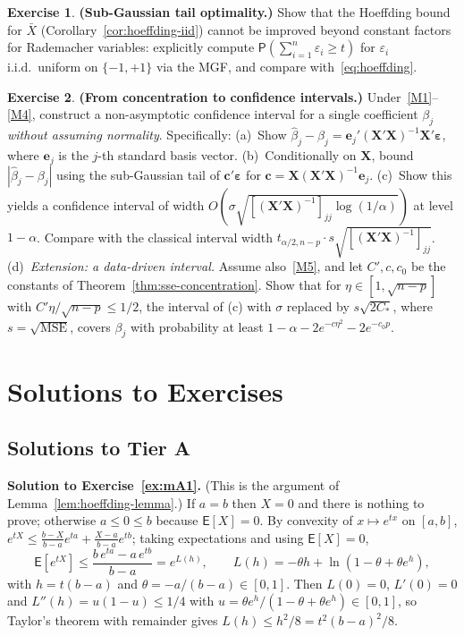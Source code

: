 \documentclass[12pt,a4paper]{article}
\theoremstyle{definition}
\newtheorem{exercise}{Exercise}[section]
\newcommand\expc{\mathsf{E}}
\newcommand\prb{\mathsf{P}}
\newcommand{\MSE}{\mathrm{MSE}}
\newcommand{\bX}{\mathbf{X}}
\newcommand{\be}{\boldsymbol{\varepsilon}}
\def\bc{\mathbf{c}}
\begin{document}
\begin{exercise}\label{ex:mC3}
\textbf{(Sub-Gaussian tail optimality.)} Show that the Hoeffding bound for $\bar{X}$ (Corollary~\ref{cor:hoeffding-iid}) cannot be improved beyond constant factors for Rademacher variables: explicitly compute $\prb(\sum_{i=1}^n \varepsilon_i \geqslant t)$ for $\varepsilon_i$ i.i.d.\ uniform on $\{-1, +1\}$ via the MGF, and compare with~\eqref{eq:hoeffding}.
\end{exercise}

\begin{exercise}\label{ex:mC4}
\textbf{(From concentration to confidence intervals.)} Under~\ref{M1}--\ref{M4}, construct a non-asymptotic confidence interval for a single coefficient $\beta_j$ \emph{without assuming normality}. Specifically: (a)~Show $\hat\beta_j - \beta_j = \mathbf{e}_j'(\bX'\bX)^{-1}\bX'\be$, where $\mathbf{e}_j$ is the $j$-th standard basis vector. (b)~Conditionally on $\bX$, bound $|\hat\beta_j - \beta_j|$ using the sub-Gaussian tail of $\bc'\be$ for $\bc = \bX(\bX'\bX)^{-1}\mathbf{e}_j$. (c)~Show this yields a confidence interval of width $O(\sigma\sqrt{[(\bX'\bX)^{-1}]_{jj}\log(1/\alpha)})$ at level $1-\alpha$. Compare with the classical interval width $t_{\alpha/2, n-p}\cdot s\sqrt{[(\bX'\bX)^{-1}]_{jj}}$. (d)~\emph{Extension: a data-driven interval.} Assume also~\ref{M5}, and let $C', c, c_0$ be the constants of Theorem~\ref{thm:sse-concentration}. Show that for $\eta \in [1, \sqrt{n-p}]$ with $C'\eta/\sqrt{n-p} \leqslant 1/2$, the interval of (c) with $\sigma$ replaced by $s\sqrt{2C_*}$, where $s = \sqrt{\MSE}$, covers $\beta_j$ with probability at least $1 - \alpha - 2e^{-c\eta^2} - 2e^{-c_0p}$.
\end{exercise}

\section{Solutions to Exercises}\label{sec:modern-solutions}

\subsection*{Solutions to Tier A}

\textbf{Solution to Exercise~\ref{ex:mA1}.} (This is the argument of Lemma~\ref{lem:hoeffding-lemma}.) If $a = b$ then $X = 0$ and there is nothing to prove; otherwise $a \leqslant 0 \leqslant b$ because $\expc[X] = 0$. By convexity of $x \mapsto e^{tx}$ on $[a,b]$, $e^{tX} \leqslant \frac{b - X}{b - a}e^{ta} + \frac{X - a}{b - a}e^{tb}$; taking expectations and using $\expc[X] = 0$,
\[
\expc[e^{tX}] \leqslant \frac{b\,e^{ta} - a\,e^{tb}}{b - a} = e^{L(h)}, \qquad L(h) = -\theta h + \ln(1 - \theta + \theta e^h),
\]
with $h = t(b - a)$ and $\theta = -a/(b - a) \in [0,1]$. Then $L(0) = 0$, $L'(0) = 0$ and $L''(h) = u(1 - u) \leqslant 1/4$ with $u = \theta e^h/(1 - \theta + \theta e^h) \in [0,1]$, so Taylor's theorem with remainder gives $L(h) \leqslant h^2/8 = t^2(b-a)^2/8$.
\end{document}
